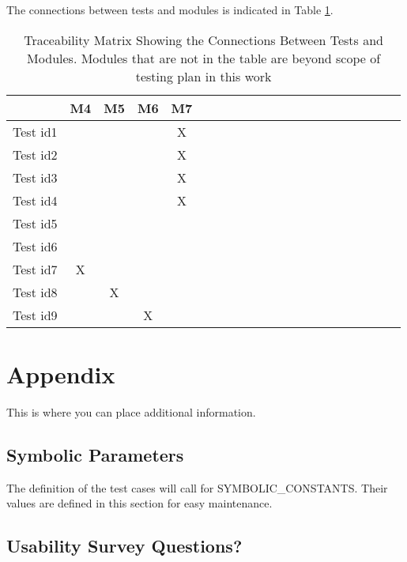 \documentclass[12pt, titlepage]{article}
\begin{document}
The connections between tests and modules is indicated in Table \ref{Table:B_trace}.
\begin{table}
	\centering
	\begin{tabular}{|c|c|c|c|c|c|c|c|c|c|c|c|c|c|c|c|c|c|c|c|c|}
		\hline        
		             & M4 & M5 & M6 & M7  \\
		\hline
		Test id1        && & & X \\ \hline
		Test id2        & & & &X \\ \hline
		Test id3        & & & &X  \\ \hline
		Test id4        & & & &X\\ \hline
		Test id5        & & & &   \\ \hline
		Test id6        & & & &  \\ \hline
		Test id7        &X& & &   \\ \hline
		Test id8        & &X& &   \\ \hline
		Test id9        & & &X&  \\ \hline
	\end{tabular}
	\caption{Traceability Matrix Showing the Connections Between Tests and Modules. Modules that are not in the table are beyond scope of testing plan in this work}
	\label{Table:B_trace}
\end{table}

\newpage





\newpage

\section{Appendix}

This is where you can place additional information.

\subsection{Symbolic Parameters}

The definition of the test cases will call for SYMBOLIC\_CONSTANTS.
Their values are defined in this section for easy maintenance.

\subsection{Usability Survey Questions?} \label{usab}
\end{document}
